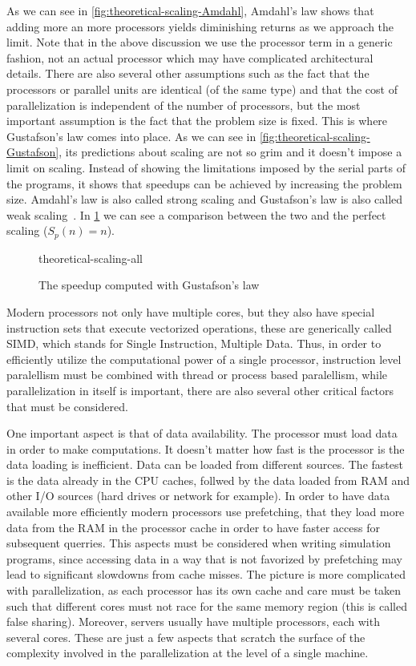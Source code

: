 \documentclass[12pt, class=report, crop=false]{standalone}
\begin{document}
As we can see in \cref{fig:theoretical-scaling-Amdahl}, Amdahl's law shows that
adding more an more processors yields diminishing returns as we approach the
limit. Note that in the above discussion we use the processor term in a generic
fashion, not an actual processor which may have complicated architectural details.
There are also several other assumptions such as the fact that the processors
or parallel units are identical (of the same type) and that the cost of parallelization
is independent of the number of processors, but the most important assumption
is the fact that the problem size is fixed. This is where Gustafson's law
comes into place. As we can see in \cref{fig:theoretical-scaling-Gustafson},
its predictions about scaling are not so grim and it doesn't impose a limit on
scaling. Instead of showing the limitations imposed by the serial parts of the
programs, it shows that speedups can be achieved by increasing the problem size.
Amdahl's law is also called strong scaling and Gustafson's law is also called
weak scaling~\autocite{lin_scalabilitystrong_2018}.
In \cref{fig:theoretical-scaling} we can see a comparison
between the two and the perfect scaling (\(S_p(n)=n\)).

\begin{figure}[h]
  \centering
  {theoretical-scaling-all}%
  \caption{The speedup computed with Gustafson's law}\label{fig:theoretical-scaling}%
\end{figure}

Modern processors not only have multiple cores, but they also have special instruction
sets that execute vectorized operations, these are generically called SIMD, which
stands for Single Instruction, Multiple Data. Thus, in order to efficiently utilize
the computational power of a single processor, instruction level paralellism must
be combined with thread or process based paralellism, while parallelization in
itself is important, there are also several other critical factors that must be
considered.

One important aspect is that of data availability. The processor must load data
in order to make computations. It doesn't matter how fast is the processor is the
data loading is inefficient. Data can be loaded from different sources. The
fastest is the data already in the CPU caches, follwed by the data loaded from RAM
and other I/O sources (hard drives or network for example). In order to have data
available more efficiently modern processors use prefetching, that they load more
data from the RAM in the processor cache in order to have faster access for subsequent
querries. This aspects must be considered when writing simulation programs, since
accessing data in a way that is not favorized by prefetching may lead to significant
slowdowns from cache misses. The picture is more complicated with parallelization,
as each processor has its own cache and care must be taken such that different
cores must not race for the same memory region (this is called false sharing).
Moreover, servers usually have multiple processors, each with several cores.
These are just a few aspects that scratch the surface of the complexity involved
in the parallelization at the level of a single machine.
\end{document}
